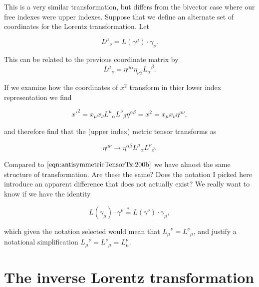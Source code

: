 This is a very similar transformation, but differs from the bivector case where our free indexes were upper indexes.  Suppose that we define an alternate set of coordinates for the Lorentz transformation.  Let

\begin{equation}\label{eqn:antisymmetricTensorTx:380}
{L^\mu}_\nu = L(\gamma^\mu) \cdot \gamma_\nu.
\end{equation}

This can be related to the previous coordinate matrix by
\begin{equation}\label{eqn:antisymmetricTensorTx:390}
{L^\mu}_\nu = \eta^{\mu \alpha } \eta_{\nu \beta } {L_\alpha}^\beta. 
\end{equation}

If we examine how the coordinates of $x^2$ transform in thier lower index representation we find

\begin{equation}\label{eqn:antisymmetricTensorTx:400}
{x'}^2 = x_\mu x_\nu {L^\mu}_\alpha {L^\nu}_\beta \eta^{\alpha \beta} = x^2 = x_\mu x_\nu \eta^{\mu \nu},
\end{equation}

and therefore find that the (upper index) metric tensor transforms as

\begin{equation}\label{eqn:antisymmetricTensorTx:410}
\eta^{\mu \nu} \rightarrow
\eta^{\alpha \beta}
{L^\mu}_\alpha {L^\nu}_\beta .
\end{equation}

Compared to $\ref{eqn:antisymmetricTensorTx:200b}$ we have almost the same structure of transformation.  Are these the same?  Does the notation I picked here introduce an apparent difference that does not actually exist?  We really want to know if we have the identity

\begin{equation}\label{eqn:antisymmetricTensorTx:420}
L(\gamma_\mu) \cdot \gamma^\nu
\stackrel{?}{=}
L(\gamma^\nu) \cdot \gamma_\mu,
\end{equation}

which given the notation selected would mean that ${L_\mu}^\nu = {L^\nu}_\mu$, and justify a notational simplification ${L_\mu}^\nu = {L^\nu}_\mu = L^\nu_\mu$.

\section{The inverse Lorentz transformation}

